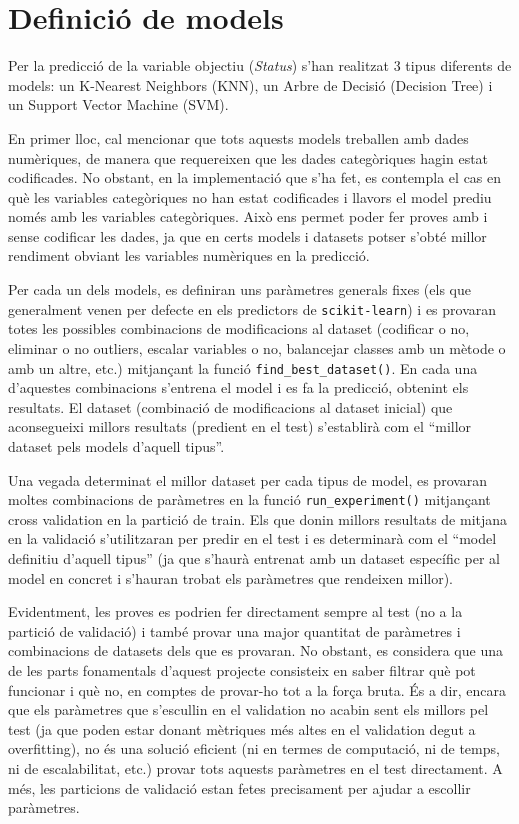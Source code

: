 \section{Definició de models}
Per la predicció de la variable objectiu (\textit{Status}) s'han realitzat 3 tipus diferents de models: un K-Nearest Neighbors (KNN), un Arbre de Decisió (Decision Tree) i un Support Vector Machine (SVM). 

En primer lloc, cal mencionar que tots aquests models treballen amb dades numèriques, de manera que requereixen que les dades categòriques hagin estat codificades. No obstant, en la implementació que s'ha fet, es contempla el cas en què les variables categòriques no han estat codificades i llavors el model prediu només amb les variables categòriques. Això ens permet poder fer proves amb i sense codificar les dades, ja que en certs models i datasets potser s'obté millor rendiment obviant les variables numèriques en la predicció.

Per cada un dels models, es definiran uns paràmetres generals fixes (els que generalment venen per defecte en els predictors de \texttt{scikit-learn}) i es provaran totes les possibles combinacions de modificacions al dataset (codificar o no, eliminar o no outliers, escalar variables o no, balancejar classes amb un mètode o amb un altre, etc.) mitjançant la funció \texttt{find\_best\_dataset()}. En cada una d'aquestes combinacions s'entrena el model i es fa la predicció, obtenint els resultats. El dataset (combinació de modificacions al dataset inicial) que aconsegueixi millors resultats (predient en el test) s'establirà com el ``millor dataset pels models d'aquell tipus''.

Una vegada determinat el millor dataset per cada tipus de model, es provaran moltes combinacions de paràmetres en la funció \texttt{run\_experiment()} mitjançant cross validation en la partició de train. Els que donin millors resultats de mitjana en la validació s'utilitzaran per predir en el test i es determinarà com el ``model definitiu d'aquell tipus'' (ja que s'haurà entrenat amb un dataset específic per al model en concret i s'hauran trobat els paràmetres que rendeixen millor).

Evidentment, les proves es podrien fer directament sempre al test (no a la partició de validació) i també provar una major quantitat de paràmetres i combinacions de datasets dels que es provaran. No obstant, es considera que una de les parts fonamentals d'aquest projecte consisteix en saber filtrar què pot funcionar i què no, en comptes de provar-ho tot a la força bruta. És a dir, encara que els paràmetres que s'escullin en el validation no acabin sent els millors pel test (ja que poden estar donant mètriques més altes en el validation degut a overfitting), no és una solució eficient (ni en termes de computació, ni de temps, ni de escalabilitat, etc.) provar tots aquests paràmetres en el test directament. A més, les particions de validació estan fetes precisament per ajudar a escollir paràmetres.

